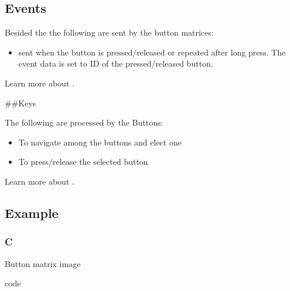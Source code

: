 \documentclass[letterpaper,10pt,english]{sphinxmanual}
\begin{document}
\subsection{Events}
\label{\detokenize{object-types/btnm:events}}
Besided the  the following  are sent by the button matrices:
\begin{itemize}
\item {} 
 sent when the button is pressed/released or repeated after long press. The event data is set to ID of the pressed/released button.

\end{itemize}

Learn more about {\hyperref[\detokenize{overview/events::doc}]{}}.

\#\#Keys

The following  are processed by the Buttons:
\begin{itemize}
\item {} 
 To navigate among the buttons and elect one

\item {} 
 To press/release the selected button

\end{itemize}

Learn more about {\hyperref[\detokenize{overview/indev::doc}]{}}.


\subsection{Example}
\label{\detokenize{object-types/btnm:example}}

\subsubsection{C}
\label{\detokenize{object-types/btnm:c}}
Button matrix image

code
\end{document}
